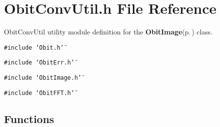 \section{Obit\-Conv\-Util.h File Reference}
\label{ObitConvUtil_8h}
Obit\-Conv\-Util utility module definition for the {\bf Obit\-Image}{\rm (p.\,\pageref{structObitImage})} class. 

{\tt \#include \char`\"{}Obit.h\char`\"{}}\par
{\tt \#include \char`\"{}Obit\-Err.h\char`\"{}}\par
{\tt \#include \char`\"{}Obit\-Image.h\char`\"{}}\par
{\tt \#include \char`\"{}Obit\-FFT.h\char`\"{}}\par
\subsection*{Functions}
